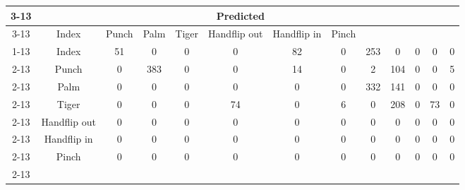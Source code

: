 \documentclass{standalone}
\begin{document}
 
 \begin{tabular}{|c |c |c |c |c |c |c |c |c |c |c |c |c |}
\cline{3-13}\multicolumn{2}{c|}{} & \multicolumn{11}{c|}{Predicted} \\ 
\cline{3-13} \multicolumn{2}{c |}{ } & Index & Punch & Palm & Tiger & Handflip out & Handflip in & Pinch\\ 
\cline{1-13}\multirow{11}{*}{\rotatebox[origin=c]{90}{Actual}} & Index & 51 & 0 & 0 & 0 & 82 & 0 & 253 & 0 & 0 & 0 & 0\\ 
 \cline{2-13} & Punch & 0 & 383 & 0 & 0 & 14 & 0 & 2 & 104 & 0 & 0 & 5\\ 
 \cline{2-13} & Palm & 0 & 0 & 0 & 0 & 0 & 0 & 332 & 141 & 0 & 0 & 0\\ 
 \cline{2-13} & Tiger & 0 & 0 & 0 & 74 & 0 & 6 & 0 & 208 & 0 & 73 & 0\\ 
 \cline{2-13} & Handflip out & 0 & 0 & 0 & 0 & 0 & 0 & 0 & 0 & 0 & 0 & 0\\ 
 \cline{2-13} & Handflip in & 0 & 0 & 0 & 0 & 0 & 0 & 0 & 0 & 0 & 0 & 0\\ 
 \cline{2-13} & Pinch & 0 & 0 & 0 & 0 & 0 & 0 & 0 & 0 & 0 & 0 & 0\\ 
 \cline{2-13}\hline \end{tabular}
 
\end{document}
